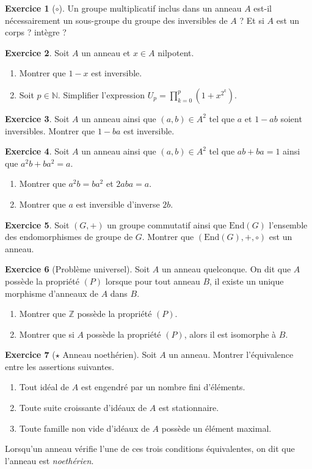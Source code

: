 \documentclass[french]{book}
\newcommand{\N}{\mathbb{N}}
\newcommand{\Z}{\mathbb{Z}}
\theoremstyle{definition}
\newtheorem{ex}{Exercice}[chapter]
\theoremstyle{theorem}
\theoremstyle{remark}
\begin{document}
\begin{ex}[$\circ$]
	Un groupe multiplicatif inclus dans un anneau $A$ est-il nécessairement un sous-groupe du groupe des inversibles de $A$ ? Et si $A$ est un corps ? intègre ?
\end{ex}

\begin{ex}
	Soit $A$ un anneau et $x\in A$ nilpotent.
	\begin{enumerate}
		\item Montrer que $1-x$ est inversible.
		\item Soit $p\in\N$. Simplifier l'expression $U_p=\displaystyle\prod_{k=0}^{p}(1+x^{2^k})$.
	\end{enumerate}
\end{ex}

\begin{ex}
	Soit $A$ un anneau ainsi que $(a,b)\in A^2$ tel que $a$ et $1-ab$ soient inversibles. Montrer que $1-ba$ est inversible.
\end{ex}

\begin{ex}
	Soit $A$ un anneau ainsi que $(a,b)\in A^2$ tel que $ab+ba=1$ ainsi que $a^2b+ba^2=a$.
	\begin{enumerate}
		\item Montrer que $a^2b=ba^2$ et $2aba=a$.
		\item Montrer que $a$ est inversible d'inverse $2b$.
	\end{enumerate}
\end{ex}

\begin{ex}
	Soit $(G,+)$ un groupe commutatif ainsi que $\text{End}(G)$ l'ensemble des endomorphismes de groupe de $G$. Montrer que $(\text{End}(G),+,\circ)$ est un anneau.
\end{ex}

\begin{ex}[Problème universel]
	Soit $A$ un anneau quelconque. On dit que $A$ possède la propriété $(P)$ lorsque pour tout anneau $B$, il existe un unique morphisme d'anneaux de $A$ dans $B$.
	\begin{enumerate}
		\item Montrer que $\Z$ possède la propriété $(P)$.
		\item Montrer que si $A$ possède la propriété $(P)$, alors il est isomorphe à $B$.
	\end{enumerate}
\end{ex}

\begin{ex}[$\star$ Anneau noethérien]
	Soit $A$ un anneau. Montrer l'équivalence entre les assertions suivantes.
	\begin{enumerate}
		\item Tout idéal de $A$ est engendré par un nombre fini d'éléments.
		\item Toute suite croissante d'idéaux de $A$ est stationnaire.
		\item Toute famille non vide d'idéaux de $A$ possède un élément maximal.
	\end{enumerate}
	Lorsqu'un anneau vérifie l'une de ces trois conditions équivalentes, on dit que l'anneau est \textit{noethérien}.
\end{ex}
\end{document}
